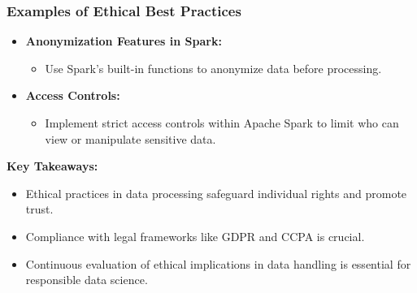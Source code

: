 \documentclass[aspectratio=169]{beamer}
\begin{document}
\begin{frame}[fragile]
    \frametitle{Examples of Ethical Best Practices}
    \begin{itemize}
        \item \textbf{Anonymization Features in Spark:}
            \begin{itemize}
                \item Use Spark's built-in functions to anonymize data before processing. 
            \end{itemize}
        \item \textbf{Access Controls:}
            \begin{itemize}
                \item Implement strict access controls within Apache Spark to limit who can view or manipulate sensitive data.
            \end{itemize}
    \end{itemize}

    \textbf{Key Takeaways:}
    \begin{itemize}
        \item Ethical practices in data processing safeguard individual rights and promote trust.
        \item Compliance with legal frameworks like GDPR and CCPA is crucial.
        \item Continuous evaluation of ethical implications in data handling is essential for responsible data science.
    \end{itemize}
\end{frame}
\end{document}
